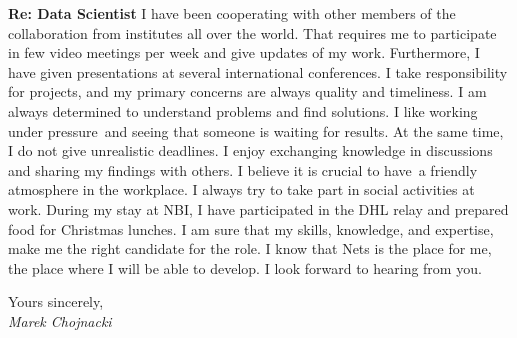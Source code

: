 \documentclass[a4paper,11pt]{letter}
\begin{document}
\begin{letter}{\bf{Re: Data Scientist}}
\newline
I have been cooperating with other members of the collaboration from institutes all over the world.
That requires me to participate in few video meetings per week and give updates of my work. 
Furthermore, I have given presentations at several international conferences.
\vspace{0.15cm}	
\newline
I take responsibility for projects, and my primary concerns are always quality and timeliness.
I am always determined to understand problems and find solutions.
I like working under pressure and seeing that someone is waiting for results. 
At the same time, I do not give unrealistic deadlines.
I enjoy exchanging knowledge in discussions and sharing my findings with others.
\vspace{0.15cm}	
\newline
I believe it is crucial to have a friendly atmosphere in the workplace.
I always try to take part in social activities at work.
During my stay at NBI, I have participated in the DHL relay and prepared food for Christmas lunches.
\vspace{0.15cm}	
\newline
I am sure that my skills, knowledge, and expertise, make me the right candidate for the role.
I know that Nets is the place for me, the place where I will be able to develop.
\vspace{0.15cm}	
\newline
I look forward to hearing from you.
\begin{flushleft}
Yours sincerely,
\\\it{Marek Chojnacki}
\end{flushleft}
\end{letter}
\end{document}
